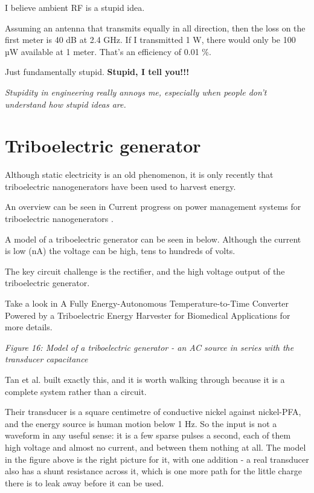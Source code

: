 I believe ambient RF is a stupid idea.

Assuming an antenna that transmits equally in all direction, then the
loss on the first meter is 40 dB at 2.4 GHz. If I transmitted 1 W, there
would only be 100 µW available at 1 meter. That's an efficiency of 0.01
\%.

Just fundamentally stupid. \textbf{Stupid, I tell you!!!}

\emph{Stupidity in engineering really annoys me, especially when people
don't understand how stupid ideas are.}

\section{Triboelectric generator}\label{triboelectric-generator}

Although static electricity is an old phenomenon, it is only recently
that triboelectric nanogenerators have been used to harvest energy.

An overview can be seen in Current progress on power management systems
for triboelectric nanogenerators .

A model of a triboelectric generator can be seen in below. Although the
current is low (nA) the voltage can be high, tens to hundreds of volts.

The key circuit challenge is the rectifier, and the high voltage output
of the triboelectric generator.

Take a look in A Fully Energy-Autonomous Temperature-to-Time Converter
Powered by a Triboelectric Energy Harvester for Biomedical Applications
 for more details.


{
\centering
{}
}

\emph{Figure 16: Model of a triboelectric generator - an AC source in
series with the transducer capacitance}

Tan et al.  built exactly this, and it is
worth walking through because it is a complete system rather than a
circuit.

Their transducer is a square centimetre of conductive nickel against
nickel-PFA, and the energy source is human motion below 1 Hz. So the
input is not a waveform in any useful sense: it is a few sparse pulses a
second, each of them high voltage and almost no current, and between
them nothing at all. The model in the figure above is the right picture
for it, with one addition - a real transducer also has a shunt
resistance across it, which is one more path for the little charge there
is to leak away before it can be used.

